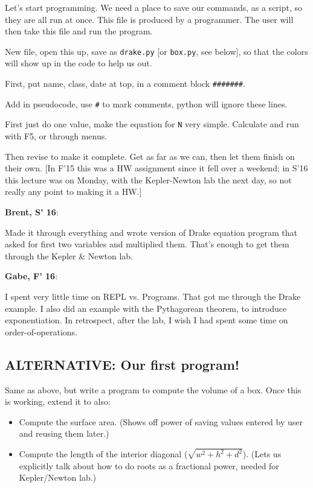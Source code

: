 \documentclass{article}
\newenvironment{reflect}[1]
{
  \noindent
  \begin{lrbox}{\reflectbox}
    \begin{minipage}[t]{\textwidth}
      \textbf{#1}:
}{
    \end{minipage}
  \end{lrbox}
  \fbox{\usebox{\reflectbox}}
}
\begin{document}
Let's start programming.  We need a place to save our commands, as a
script, so they are all run at once.  This file is produced by a
programmer.  The user will then take this file and run the program.

New file, open this up, save as \verb|drake.py| [or \verb|box.py|, see
below], so
that the colors will show up in the code to help us out.

First, put name, class, date at top, in a comment block \verb|#######|.

Add in pseudocode, use \verb|#| to mark comments, python will ignore
these lines.

First just do one value, make the equation for \verb|N| very simple.
Calculate and run with F5, or through menus.

Then revise to make it complete.  Get as far as we can, then let them
finish on their own. [In F'15 this was a HW assignment since it
fell over a weekend; in S'16 this lecture was on Monday, with the
Kepler-Newton lab the next day, so not really any point to making it a HW.]

\begin{reflect}{Brent, S' 16}
  Made it through everything and wrote version of Drake equation
  program that asked for first two variables and multiplied them.
  That's enough to get them through the Kepler \& Newton lab.
\end{reflect}
\begin{reflect}{Gabe, F' 16}
I spent very little time on REPL vs. Programs. That got me through the Drake example. I also did an example with the Pythagorean theorem, to introduce exponentiation. In retrospect, after the lab, I wish I had spent some time on order-of-operations.
\end{reflect}

\subsection*{ALTERNATIVE: Our first program!}

Same as above, but write a program to compute the volume of a box.
Once this is working, extend it to also:
\begin{itemize}
\item Compute the surface area.  (Shows off power of saving values
  entered by user and reusing them later.)
\item Compute the length of the interior diagonal
  ($\sqrt{w^2 + h^2 + d^2}$).  (Lets us explicitly talk about how to do
  roots as a fractional power, needed for Kepler/Newton lab.)
\end{itemize}
\end{document}
